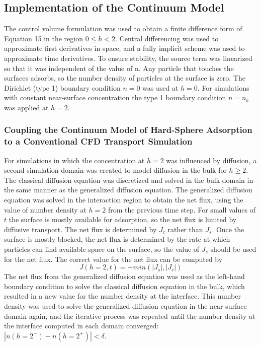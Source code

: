 \subsection{Implementation of the Continuum Model}

The control volume formulation \cite{Patankar1980} was used to obtain
a finite difference form of Equation 15 in the region $0\leq h<2$.
Central differencing was used to approximate first derivatives in
space, and a fully implicit scheme was used to approximate time derivatives.
To ensure stability, the source term was linearized so that it was
independent of the value of n. Any particle that touches the surfaces
adsorbs, so the number density of particles at the surface is zero.
The Dirichlet (type 1) boundary condition $n=0$ was used at $h=0$.
For simulations with constant near-surface concentration the type
1 boundary condition $n=n_{b}$ was applied at $h=2$. 


\subsubsection{Coupling the Continuum Model of Hard-Sphere Adsorption to a Conventional
CFD Transport Simulation}

For simulations in which the concentration at $h=2$ was influenced
by diffusion, a second simulation domain was created to model diffusion
in the bulk for $h\geq2$. The classical diffusion equation was discretized
and solved in the bulk domain in the same manner as the generalized
diffusion equation. The generalized diffusion equation was solved
in the interaction region to obtain the net flux, using the value
of number density at $h=2$ from the previous time step. For small
values of $t$ the surface is mostly available for adsorption, so
the net flux is limited by diffusive transport. The net flux is determined
by $J_{c}$ rather than $J_{s}$. Once the surface is mostly blocked,
the net flux is determined by the rate at which particles can find
available space on the surface, so the value of $J_{s}$ should be
used for the net flux. The correct value for the net flux can be computed
by\[
J\left(h=2,t\right)=-min\left(\left|J_{s}\right|,\left|J_{c}\right|\right)\]
 The net flux from the generalized diffusion equation was used as
the left-hand boundary condition to solve the classical diffusion
equation in the bulk, which resulted in a new value for the number
density at the interface. This number density was used to solve the
generalized diffusion equation in the near-surface domain again, and
the iterative process was repeated until the number density at the
interface computed in each domain converged:$\left|n\left(h=2^{-}\right)-n\left(h=2^{+}\right)\right|<\delta$.


